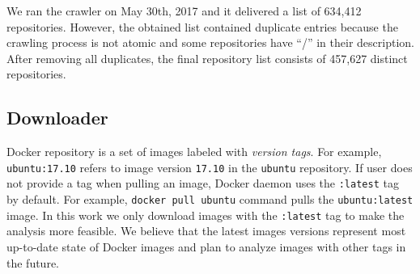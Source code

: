 We ran the crawler on May 30th, 2017 and it delivered a list of 634,412 repositories.
%
However, the obtained list contained duplicate entries because 
the crawling process is not atomic and some repositories have ``/'' in their description.
%
After removing all duplicates, the final repository list consists of 457,627
distinct repositories. 
%


%
%
%

\subsection{Downloader}
\label{sec:downloader}

Docker repository is a set of images labeled with \emph{version tags}.
%
For example, \texttt{ubuntu:17.10} refers to image version \texttt{17.10} in the
\texttt{ubuntu} repository.
%
If user does not provide a tag when pulling an image, 
Docker daemon uses the \texttt{:latest} tag by default.
For example, \texttt{docker pull ubuntu} command pulls the
\texttt{ubuntu:latest} image.
%
In this work we only download images with the \texttt{:latest} tag to
make the analysis more feasible.  We believe that the latest
images versions represent most up-to-date state of  Docker images
%
and plan to analyze images with other tags in the future.



